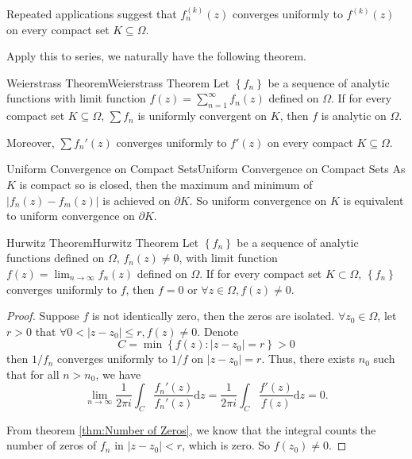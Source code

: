 \documentclass[../main.tex]{subfiles}
\begin{document}
Repeated applications suggest that $f_n^{(k)}(z)$ converges uniformly to $f^{(k)}(z)$ on every compact set $K \subseteq \Omega$.

Apply this to series, we naturally have the following theorem.
\begin{theorem}{Weierstrass Theorem}{Weierstrass Theorem}
	Let $\left\{ f_n \right\}$ be a sequence of analytic functions with limit function $f(z) = \sum_{n=1}^{\infty } f_n(z)$ defined on $\Omega$. If for every compact set $K \subseteq \Omega$, $\sum f_n$ is uniformly convergent on $K$, then $f$ is analytic on $\Omega$.

	Moreover, $\sum f_n'(z)$ converges uniformly to $f'(z)$ on every compact $K \subseteq \Omega$.
\end{theorem}

\begin{proposition}{Uniform Convergence on Compact Sets}{Uniform Convergence on Compact Sets}
	As $K$ is compact so is closed, then the maximum and minimum of $\left|f_n(z)-f_m(z)\right|$ is achieved on $\partial K$. So uniform convergence on $K$ is equivalent to uniform convergence on $\partial K$.
\end{proposition}

\begin{theorem}{Hurwitz Theorem}{Hurwitz Theorem}
	Let $\left\{ f_n \right\}$ be a sequence of analytic functions defined on $\Omega$, $f_n(z)\neq 0$, with limit function $f(z) = \lim_{n \to \infty } f_n(z)$ defined on $\Omega$. If for every compact set $K \subset \Omega$, $\left\{ f_n \right\}$ converges uniformly to $f$, then $f=0$ or $\forall z\in \Omega, f(z)\neq 0$.
\end{theorem}
\begin{proof}
Suppose $f$ is not identically zero, then the zeros are isolated. $\forall z_0\in \Omega$, let $r>0$ that $\forall 0<\left|z-z_0\right|\leq r, f(z) \neq 0$. Denote
\begin{equation*}
	C = \min \left\{ f(z): \left|z-z_0\right|=r \right\} >0
\end{equation*}
then $1 / f_n$ converges uniformly to $1 / f$ on $\left|z-z_0\right|=r$. Thus, there exists $n_0$ such that for all $n>n_0$, we have
\begin{equation*}
	\lim_{n \to \infty } \frac{1}{2 \pi i} \int_{C} \frac{f_n'(z)}{f_n'(z)} \mathrm{d} z = \frac{1}{2 \pi i} \int_{C} \frac{f'(z)}{f(z)} \mathrm{d} z = 0.
\end{equation*}

From theorem \ref{thm:Number of Zeros}, we know that the integral counts the number of zeros of $f_n$ in $\left|z-z_0\right|<r$, which is zero. So $f(z_0)\neq 0$. 
\end{proof}
\end{document}
